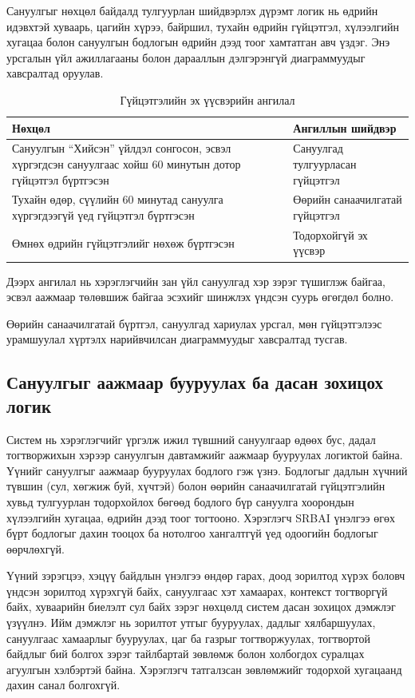 Сануулгыг нөхцөл байдалд тулгуурлан шийдвэрлэх дүрэмт логик нь өдрийн идэвхтэй хуваарь, цагийн хүрээ, байршил, тухайн өдрийн гүйцэтгэл, хүлээлгийн хугацаа болон сануулгын бодлогын өдрийн дээд тоог хамтатган авч үздэг. Энэ урсгалын үйл ажиллагааны болон дарааллын дэлгэрэнгүй диаграммуудыг хавсралтад оруулав.

\begin{table}[htbp]
\centering
\small
\setlength{\tabcolsep}{4pt}
\begin{tabular}{|L{6.5cm}|L{6.5cm}|}
\hline
\textbf{Нөхцөл} & \textbf{Ангиллын шийдвэр} \\
\hline
Сануулгын ``Хийсэн'' үйлдэл сонгосон, эсвэл хүргэгдсэн сануулгаас хойш 60 минутын дотор гүйцэтгэл бүртгэсэн & Сануулгад тулгуурласан гүйцэтгэл \\
\hline
Тухайн өдөр, сүүлийн 60 минутад сануулга хүргэгдээгүй үед гүйцэтгэл бүртгэсэн & Өөрийн санаачилгатай гүйцэтгэл \\
\hline
Өмнөх өдрийн гүйцэтгэлийг нөхөж бүртгэсэн & Тодорхойгүй эх үүсвэр \\
\hline
\end{tabular}
\caption{Гүйцэтгэлийн эх үүсвэрийн ангилал}
\end{table}

Дээрх ангилал нь хэрэглэгчийн зан үйл сануулгад хэр зэрэг түшиглэж байгаа, эсвэл аажмаар төлөвшиж байгаа эсэхийг шинжлэх үндсэн суурь өгөгдөл болно.

Өөрийн санаачилгатай бүртгэл, сануулгад хариулах урсгал, мөн гүйцэтгэлээс урамшуулал хүртэлх нарийвчилсан диаграммуудыг хавсралтад тусгав.

\subsection{Сануулгыг аажмаар бууруулах ба дасан зохицох логик}

Систем нь хэрэглэгчийг үргэлж ижил түвшний сануулгаар өдөөх бус, дадал тогтворжихын хэрээр сануулгын давтамжийг аажмаар бууруулах логиктой байна. Үүнийг сануулгыг аажмаар бууруулах бодлого гэж үзнэ. Бодлогыг дадлын хүчний түвшин (сул, хөгжиж буй, хүчтэй) болон өөрийн санаачилгатай гүйцэтгэлийн хувьд тулгуурлан тодорхойлох бөгөөд бодлого бүр сануулга хоорондын хүлээлгийн хугацаа, өдрийн дээд тоог тогтооно. Хэрэглэгч SRBAI үнэлгээ өгөх бүрт бодлогыг дахин тооцох ба нотолгоо хангалтгүй үед одоогийн бодлогыг өөрчлөхгүй.

Үүний зэрэгцээ, хэцүү байдлын үнэлгээ өндөр гарах, доод зорилтод хүрэх боловч үндсэн зорилтод хүрэхгүй байх, сануулгаас хэт хамаарах, контекст тогтворгүй байх, хуваарийн биелэлт сул байх зэрэг нөхцөлд систем дасан зохицох дэмжлэг үзүүлнэ. Ийм дэмжлэг нь зорилтот утгыг бууруулах, дадлыг хялбаршуулах, сануулгаас хамаарлыг бууруулах, цаг ба газрыг тогтворжуулах, тогтвортой байдлыг бий болгох зэрэг тайлбартай зөвлөмж болон холбогдох суралцах агуулгын хэлбэртэй байна. Хэрэглэгч татгалзсан зөвлөмжийг тодорхой хугацаанд дахин санал болгохгүй.

